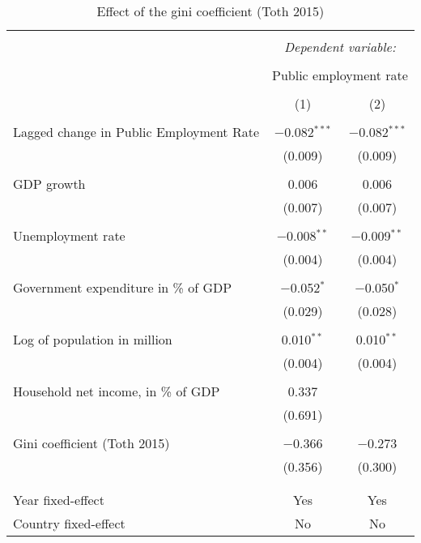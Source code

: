 
\begin{table}[!htbp] \centering 
  \caption{Effect of the gini coefficient (Toth 2015)} 
  \label{} 
\begin{tabular}{@{\extracolsep{5pt}}lcc} 
\\[-1.8ex]\hline 
\hline \\[-1.8ex] 
 & \multicolumn{2}{c}{\textit{Dependent variable:}} \\ 
\cline{2-3} 
\\[-1.8ex] & \multicolumn{2}{c}{Public employment rate} \\ 
\\[-1.8ex] & (1) & (2)\\ 
\hline \\[-1.8ex] 
 Lagged change in Public Employment Rate & $-$0.082$^{***}$ & $-$0.082$^{***}$ \\ 
  & (0.009) & (0.009) \\ 
  & & \\ 
 GDP growth & 0.006 & 0.006 \\ 
  & (0.007) & (0.007) \\ 
  & & \\ 
 Unemployment rate & $-$0.008$^{**}$ & $-$0.009$^{**}$ \\ 
  & (0.004) & (0.004) \\ 
  & & \\ 
 Government expenditure in \% of GDP & $-$0.052$^{*}$ & $-$0.050$^{*}$ \\ 
  & (0.029) & (0.028) \\ 
  & & \\ 
 Log of population in million & 0.010$^{**}$ & 0.010$^{**}$ \\ 
  & (0.004) & (0.004) \\ 
  & & \\ 
 Household net income, in \% of GDP & 0.337 &  \\ 
  & (0.691) &  \\ 
  & & \\ 
 Gini coefficient (Toth 2015) & $-$0.366 & $-$0.273 \\ 
  & (0.356) & (0.300) \\ 
  & & \\ 
\hline \\[-1.8ex] 
Year fixed-effect & Yes & Yes \\ 
Country fixed-effect & No & No \\ 

\end{tabular}
\end{table}
